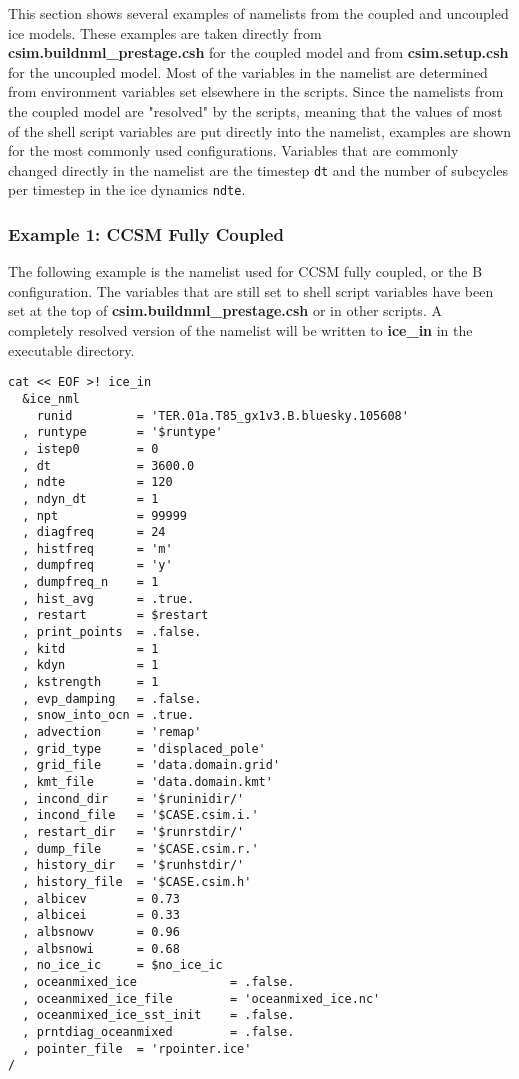 
This section shows several examples of namelists from the coupled and uncoupled
ice models.  These examples are taken directly from {\bf csim.buildnml\_prestage.csh}
for the coupled model and from {\bf csim.setup.csh} for the uncoupled model.  
Most of the variables in the namelist are determined from environment variables
set elsewhere in the scripts. Since the namelists from the coupled model are
"resolved" by the scripts, meaning that the values of most of the shell script
variables are put directly into the namelist, examples are shown for the most
commonly used configurations.  Variables that are commonly changed directly in
the namelist are the timestep {\tt dt} and the number of subcycles per timestep
in the ice dynamics {\tt ndte}. 

\subsubsection {Example 1: CCSM Fully Coupled}
\label{example1_nml}

The following example is the namelist used for CCSM fully coupled, or
the B configuration.  The variables that are still set to shell script
variables have been set at the top of {\bf csim.buildnml\_prestage.csh}
or in other scripts.  A completely resolved version of the namelist will
be written to {\bf ice\_in} in the executable directory.

\begin{verbatim}
cat << EOF >! ice_in
  &ice_nml
    runid         = 'TER.01a.T85_gx1v3.B.bluesky.105608'
  , runtype       = '$runtype'
  , istep0        = 0
  , dt            = 3600.0
  , ndte          = 120
  , ndyn_dt       = 1
  , npt           = 99999
  , diagfreq      = 24
  , histfreq      = 'm'
  , dumpfreq      = 'y'
  , dumpfreq_n    = 1
  , hist_avg      = .true.
  , restart       = $restart
  , print_points  = .false.
  , kitd          = 1
  , kdyn          = 1
  , kstrength     = 1
  , evp_damping   = .false.
  , snow_into_ocn = .true.
  , advection     = 'remap'
  , grid_type     = 'displaced_pole'
  , grid_file     = 'data.domain.grid'
  , kmt_file      = 'data.domain.kmt'
  , incond_dir    = '$runinidir/'
  , incond_file   = '$CASE.csim.i.'
  , restart_dir   = '$runrstdir/'
  , dump_file     = '$CASE.csim.r.'
  , history_dir   = '$runhstdir/'
  , history_file  = '$CASE.csim.h'
  , albicev       = 0.73
  , albicei       = 0.33
  , albsnowv      = 0.96
  , albsnowi      = 0.68
  , no_ice_ic     = $no_ice_ic
  , oceanmixed_ice             = .false.
  , oceanmixed_ice_file        = 'oceanmixed_ice.nc'
  , oceanmixed_ice_sst_init    = .false.
  , prntdiag_oceanmixed        = .false.
  , pointer_file  = 'rpointer.ice'
/
\end{verbatim}

